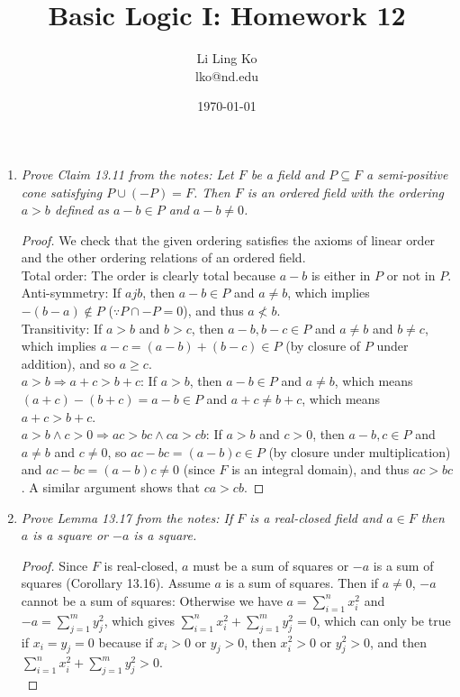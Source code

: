 \documentclass{article}
\begin{document}
\title{Basic Logic I: Homework 12}
\author{Li Ling Ko\\ lko@nd.edu}
\date{\today}
\maketitle

\begin{enumerate}[label={\bf Q\arabic*:}]
  \item \it Prove Claim 13.11 from the notes: Let $F$ be a field and
    $P\subseteq F$ a semi-positive cone satisfying $P\cup(-P)=F$. Then $F$
    is an ordered field with the ordering $a>b$ defined as $a-b\in P$ and
    $a-b\neq0$. 

    \begin{proof}
      We check that the given ordering satisfies the axioms of linear
      order and the other ordering relations of an ordered field. \\

      Total order: The order is clearly total because $a-b$ is either in
      $P$ or not in $P$. \\

      Anti-symmetry: If $ajb$, then $a-b\in P$ and $a\neq b$, which implies
      $-(b-a)\notin P$ ($\because P\cap -P=0$), and thus $a\not<b$. \\

      Transitivity: If $a>b$ and $b>c$, then $a-b,b-c\in P$ and $a\neq b$
      and $b\neq c$, which implies $a-c=(a-b)+(b-c)\in P$ (by closure of
      $P$ under addition), and so $a\geq c$. \\

      $a>b\Rightarrow a+c>b+c$: If $a>b$, then $a-b\in P$ and $a\neq b$,
      which means $(a+c)-(b+c)=a-b\in P$ and $a+c\neq b+c$, which means
      $a+c>b+c$. \\

      $a>b\wedge c>0\Rightarrow ac>bc\wedge ca>cb$: If $a>b$ and $c>0$,
      then $a-b,c\in P$ and $a\neq b$ and $c\neq0$, so $ac-bc=(a-b)c\in P$
      (by closure under multiplication) and $ac-bc=(a-b)c\neq0$ (since $F$
      is an integral domain), and thus $ac>bc$. A similar argument shows
      that $ca>cb$.
    \end{proof}

  \item \it Prove Lemma 13.17 from the notes: If $F$ is a real-closed field
    and $a\in F$ then $a$ is a square or $-a$ is a square.

    \begin{proof}
      Since $F$ is real-closed, $a$ must be a sum of squares or $-a$
      is a sum of squares (Corollary 13.16). Assume $a$ is a sum of squares.
      Then if $a\neq0$, $-a$ cannot be a sum of squares: Otherwise
      we have $a=\sum_{i=1}^n x_i^2$ and $-a=\sum_{j=1}^m y_j^2$, which
      gives $\sum_{i=1}^n x_i^2+ \sum_{j=1}^m y_j^2=0$, which can only be
      true if $x_i=y_j=0$ because if $x_i>0$ or $y_j>0$, then $x_i^2>0$ or
      $y_j^2>0$, and then $\sum_{i=1}^n x_i^2+ \sum_{j=1}^m y_j^2>0$. \\


\end{proof}
\end{enumerate}
\end{document}
